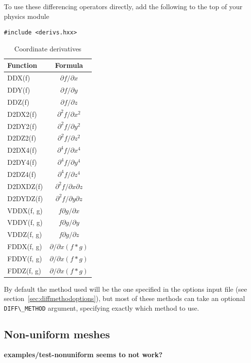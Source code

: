 \documentclass[12pt]{article}
\begin{document}
To use these differencing operators directly, add the following to the top of your physics module
\begin{lstlisting}
#include <derivs.hxx>
\end{lstlisting}

\begin{table}[htb!]
\centering
\caption{Coordinate derivatives}
\label{tab:coordinate_derivatives}
\begin{tabular}{l c}
\hline
Function & Formula \\
\hline
DDX(f) & $\partial f / \partial x$ \\
DDY(f) & $\partial f / \partial y$ \\
DDZ(f) & $\partial f / \partial z$ \\
D2DX2(f) & $\partial^2 f / \partial x^2$\\
D2DY2(f) & $\partial^2 f / \partial y^2$\\
D2DZ2(f) & $\partial^2 f / \partial z^2$\\
D2DX4(f) & $\partial^4 f / \partial x^4$\\
D2DY4(f) & $\partial^4 f / \partial y^4$\\
D2DZ4(f) & $\partial^4 f / \partial z^4$\\
D2DXDZ(f) & $\partial^2 f / \partial x\partial z$\\
D2DYDZ(f) & $\partial^2 f / \partial y\partial z$\\
\hline
VDDX(f, g) & $f \partial g / \partial x$\\
VDDY(f, g) & $f \partial g / \partial y$\\
VDDZ(f, g) & $f \partial g / \partial z$\\
\hline
FDDX(f, g) & $\partial/\partial x\left( f * g \right)$ \\
FDDY(f, g) & $\partial/\partial x\left( f * g \right)$ \\
FDDZ(f, g) & $\partial/\partial x\left( f * g \right)$ \\
\hline
\end{tabular}
\end{table}

By default the method used will be the one specified in the options input file (see section~\ref{sec:diffmethodoptions}), but most of these methods can take an optional \lstinline!DIFF\_METHOD! argument, specifying exactly which method to use.

\subsection{Non-uniform meshes}
{\color{red} \textbf{examples/test-nonuniform seems to not work?}}
\end{document}
